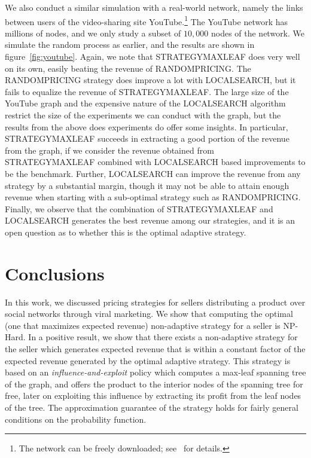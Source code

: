 \documentclass[letterpaper,twoside]{article}
\newcommand{\strategyml}{\textrm{S{\scriptsize TRATEGY}\-M{\scriptsize AX}\-L{\scriptsize EAF}}}
\newcommand{\LS}{\textrm{L{\scriptsize OCAL}\-S{\scriptsize EARCH}}}
\newcommand{\rand}{\textrm{R{\scriptsize ANDOM}\-P{\scriptsize RICING}}}
\begin{document}
We also conduct a similar simulation with a real-world network, namely the
links between users of the video-sharing site YouTube.\footnote{The network
  can be freely downloaded; see~\cite{MMGDB07} for details.}
The YouTube network has millions of nodes, and we only study a subset of
$10,000$ nodes of the network. We simulate the random process as earlier, and
the results are shown in figure~\ref{fig:youtube}. Again, we note that
\strategyml{} does very well on its own, easily beating the revenue of
\rand. The \rand{} strategy does improve a lot with \LS, but it fails to
equalize the revenue of \strategyml. The large size of the YouTube graph and
the expensive nature of the \LS{} algorithm restrict the size of the
experiments we can conduct with the graph, but the results from the above
does experiments do offer some insights. In particular, \strategyml{}
succeeds in extracting a good portion of the revenue from the graph, if we
consider the revenue obtained from \strategyml{} combined with \LS{} based
improvements to be the benchmark.  Further, \LS{} can improve the revenue
from any strategy by a substantial margin, though it may not be able to
attain enough revenue when starting with a sub-optimal strategy such as
\rand. Finally, we observe that the combination of \strategyml{} and \LS{}
generates the best revenue among our strategies, and it is an open question
as to whether this is the optimal adaptive strategy.

\section{Conclusions}
In this work, we discussed pricing strategies for sellers distributing a
product over social networks through viral marketing.  We show that computing
the optimal (one that maximizes expected revenue) non-adaptive strategy for a
seller is NP-Hard. In a positive result, we show that there exists a
non-adaptive strategy for the seller which generates expected revenue that is
within a constant factor of the expected revenue generated by the optimal
adaptive strategy. This strategy is based on an {\em influence-and-exploit}
policy which computes a max-leaf spanning tree of the graph, and offers the
product to the interior nodes of the spanning tree for free, later on
exploiting this influence by extracting its profit from the leaf nodes of the
tree. The approximation guarantee of the strategy holds for fairly general
conditions on the probability function.
\end{document}
